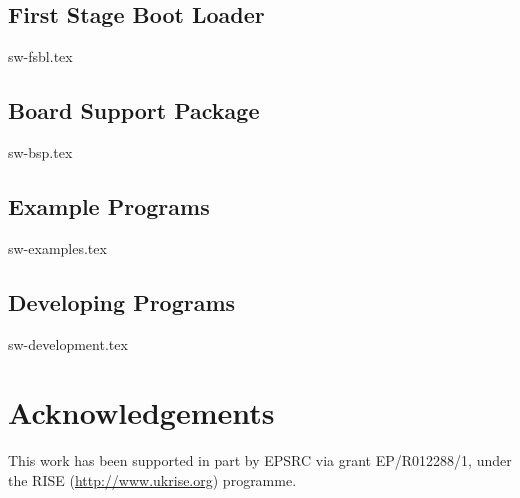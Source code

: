 \documentclass{scarv-report}
\begin{document}
\subsection{First Stage Boot Loader}
{sw-fsbl.tex}

\subsection{Board Support Package}
{sw-bsp.tex}

\subsection{Example Programs}
{sw-examples.tex}

\subsection{Developing Programs}
{sw-development.tex}

\section{Acknowledgements}

This work has been supported in part by EPSRC via grant EP/R012288/1,
under the RISE (\url{http://www.ukrise.org}) programme.


\MKEPILOGUE

\end{document}
